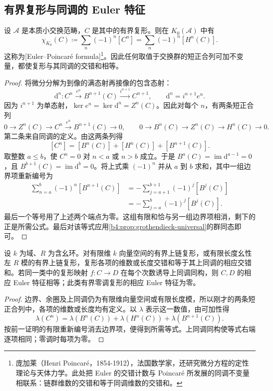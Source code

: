 \subsection{有界复形与同调的 Euler 特征}
\label{b4:subsec:0504:03}

\begin{theorem}\label{b4:thm:euler-poincare}
	设 \(\mathcal A\) 是本质小交换范畴，\(C\) 是其中的有界复形。则在 \(K_0(\mathcal A)\) 中有
	\[
		\chi_{K_0}(C)\coloneqq\sum_n(-1)^n[C^n] =\sum_n(-1)^n[H^n(C)].
	\]
	这称为[Euler–Poincaré formula]\footnote{庞加莱（Henri Poincaré，1854-1912），法国数学家，还研究微分方程的定性理论与天体力学。此处把 Euler 的交错计数与 Poincaré 所发展的同调不变量相联系：链群维数的交错和等于同调维数的交错和。}。因此任何取值于交换群的短正合列可加不变量，都使复形与其同调的交错和相等。
\end{theorem}
\begin{proof}
	将微分分解为到像的满态射再接像的包含态射：
	\[
		\mathrm{d}^n:C^n\xrightarrow{e^n}B^{n+1}(C) \xrightarrow{i^{n+1}}C^{n+1}, \qquad \mathrm{d}^n=i^{n+1}e^n.
	\]
	因为 \(i^{n+1}\) 为单态射，\(\ker e^n=\ker\mathrm{d}^n=Z^n(C)\)。因此对每个 \(n\)，有两条短正合列
	\[
		0\to Z^n(C)\to C^n\xrightarrow{e^n}B^{n+1}(C)\to0, \qquad 0\to B^n(C)\to Z^n(C)\to H^n(C)\to0.
	\]
	第二条来自同调的定义。由这两条列得
	\[
		[C^n]=[B^n(C)]+[H^n(C)]+[B^{n+1}(C)].
	\]
	取整数 \(a\le b\)，使 \(C^n=0\) 对 \(n<a\) 或 \(n>b\) 成立。于是 \(B^a(C)=\operatorname{im}\mathrm{d}^{a-1}=0\)，且 \(B^{b+1}(C)=\operatorname{im}\mathrm{d}^b=0\)。将上式乘 \((-1)^n\) 并从 \(a\) 到 \(b\) 求和，其中一组边界项重新编号为
	\[
		\begin{aligned}
			\sum_{n=a}^{b}(-1)^n[B^{n+1}(C)] &=-\sum_{j=a+1}^{b+1}(-1)^j[B^j(C)]\\
			&=-\sum_{j=a}^{b}(-1)^j[B^j(C)].
		\end{aligned}
	\]
	最后一个等号用了上述两个端点为零。这组有限和恰与另一组边界项相消，剩下的正是所需公式。最后对该等式应用\cref{b4:prop:grothendieck-universal}的群同态即可。
\end{proof}

\begin{corollary}\label{b4:cor:euler-quasi-invariance}
	设 \(k\) 为域、\(R\) 为含幺环。对有限维 \(k\) 向量空间的有界上链复形，或有限长度幺性左 \(R\) 模的有界上链复形，复形各项的维数或长度交错和等于其上同调的相应交错和。若同一类中的复形映射 \(f:C\to D\) 在每个次数诱导上同调同构，则 \(C,D\) 的相应 Euler 特征相等；此类有界零调复形的相应 Euler 特征为零。
\end{corollary}
\begin{proof}
	边界、余圈及上同调仍为有限维向量空间或有限长度模，所以刚才的两条短正合列中，各项的维数或长度均有定义。以 \(\lambda\) 表示这一数值，由可加性得
	\[
		\lambda(C^n)=\lambda(B^n(C))+\lambda(H^n(C))+\lambda(B^{n+1}(C)).
	\]
	按前一证明的有限重新编号消去边界项，便得到所需等式。上同调同构使等式右端逐项相同；零调时每项为零。
\end{proof}

